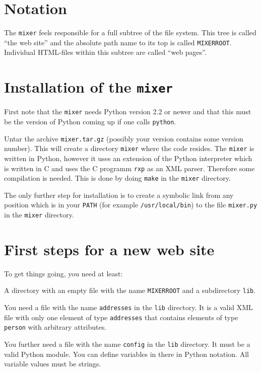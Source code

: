\documentclass[a4paper,11pt]{article}
\newcommand{\mixer}{\texttt{mixer}}
\newcommand{\MIXERROOT}{\texttt{MIXERROOT}}
\begin{document}
\section{Notation}
\label{notation}

The {\mixer} feels responsible for a full subtree of the file system.
This tree is called "`the web site"' and the absolute path name to
its top is called \MIXERROOT. Individual HTML-files within this
subtree are called "`web pages"'.

\section{Installation of the \mixer}


First note that the {\mixer} needs Python version 2.2 or newer and that
this must be the version of Python coming up if one calls \verb!python!.

Untar the archive \verb!mixer.tar.gz! (possibly your version contains
some version number). This will create a directory \verb!mixer! where
the code resides. The {\mixer} is written in Python, however it uses
an extension of the Python interpreter which is written in C and uses
the C programm \verb!rxp! as an XML parser. Therefore some compilation
is needed. This is done by doing \verb!make! in the {\mixer} directory.

The only further step for installation is to create a symbolic link from
any position which is in your \verb!PATH! (for example \verb!/usr/local/bin!)
to the file \verb!mixer.py! in the {\mixer} directory.


\section{First steps for a new web site}


To get things going, you need at least:

A directory with an empty file with the name \verb!MIXERROOT! and a
subdirectory \verb!lib!.

You need a file with the name \verb!addresses! in the \verb!lib! directory.
It is a valid XML file with only one element of type \verb!addresses! that
contains elements of type \verb!person! with arbitrary attributes.

You further need a file with the name \verb!config! in the \verb!lib! 
directory. It must be a valid Python module. You can define variables
in there in Python notation. All variable values must be strings.
\end{document}
